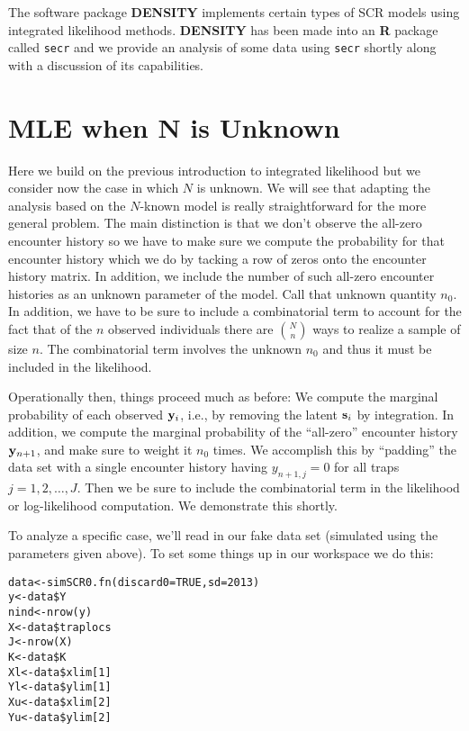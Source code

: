 The
software package {\bf DENSITY} \citep{efford_etal:2004} implements
certain types of SCR models using integrated likelihood methods.
{\bf DENSITY} has been made into an {\bf R} package called \mbox{\tt secr} \citep{efford:2011}
and we provide an analysis of some data using \mbox{\tt secr} shortly along
with a discussion of its capabilities.


\section{MLE when N is Unknown} 

Here we build on the previous introduction to integrated likelihood
but we consider now the case in which $N$ is unknown. We will see that
adapting the analysis based on the $N$-known model is really
straightforward for the more general problem. The main distinction is
that we don’t observe the all-zero encounter history so we have to
make sure we compute the probability for that encounter history which
we do by tacking a row of zeros onto the encounter history matrix. In
addition, we include the number of such all-zero encounter histories
as an unknown parameter of the model. Call that unknown quantity $n_{0}$.
In addition, we have to be sure to include a combinatorial term to
account for the fact that of the $n$ observed individuals there are
${N \choose n}$
 ways to realize a sample of size $n$. The combinatorial term
involves the unknown $n_{0}$ and thus it must be included in the likelihood.

Operationally then, things proceed much as before: 
We compute the marginal probability of each observed ${\bf y}_{i}$,
i.e., by removing the latent ${\bf s}_{i}$ by integration. In
addition, we 
 compute the marginal probability of the ``all-zero'' encounter
history ${\bf y}_{n+1}$, and make sure to weight it $n_{0}$ times. We
accomplish this by ``padding'' the data set with a single encounter
history having $y_{n+1,j}=0$ for all traps $j=1,2,\ldots,J$. Then we
be sure to include the combinatorial term in the likelihood or
log-likelihood computation. We demonstrate this shortly.

To analyze a specific case, we’ll read in our fake data set (simulated
using the parameters given above). To set some things up in our
workspace we do this:
\begin{verbatim}
data<-simSCR0.fn(discard0=TRUE,sd=2013)
y<-data$Y
nind<-nrow(y)
X<-data$traplocs
J<-nrow(X)
K<-data$K
Xl<-data$xlim[1]
Yl<-data$ylim[1]
Xu<-data$xlim[2]
Yu<-data$ylim[2]
\end{verbatim}

